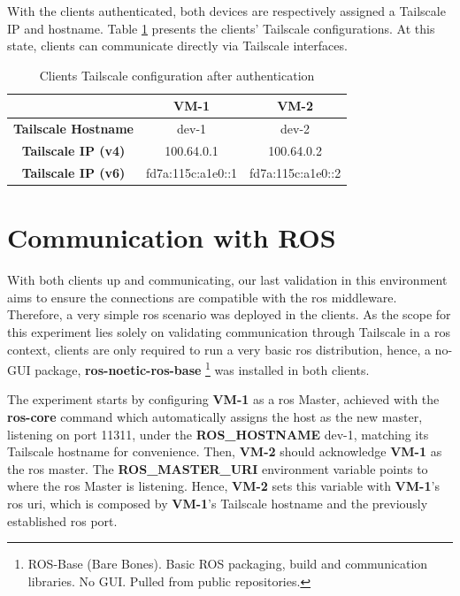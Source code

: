 \documentclass[11pt,twoside,a4paper]{report}
\begin{document}
With the clients authenticated, both devices are respectively assigned a Tailscale IP and hostname. Table \ref{tab:tsips} presents the clients' Tailscale configurations. At this state, clients can communicate directly via Tailscale interfaces.

\begin{table}[]
\centering
\begin{tabular}{c|c|c|}
\cline{2-3}
\textbf{}                                         & \textbf{VM-1} & \textbf{VM-2} \\ \hline
\multicolumn{1}{|c|}{\textbf{Tailscale Hostname}} & dev-1         & dev-2         \\ \hline
\multicolumn{1}{|c|}{\textbf{Tailscale IP (v4)}}  & 100.64.0.1    & 100.64.0.2    \\ \hline
\multicolumn{1}{|c|}{\textbf{Tailscale IP (v6)}}  & fd7a:115c:a1e0::1     & fd7a:115c:a1e0::2         \\ \hline
\end{tabular}
\caption{Clients Tailscale configuration after authentication}
\label{tab:tsips}
\end{table}

\section{Communication with ROS}

With both clients up and communicating, our last validation in this environment aims to ensure the connections are compatible with the \ac{ros} middleware. Therefore, a very simple \ac{ros} scenario was deployed in the clients. As the scope for this experiment lies solely on validating communication through Tailscale in a \ac{ros} context, clients are only required to run a very basic \ac{ros} distribution, hence, a no-GUI package, \textbf{ros-noetic-ros-base} \footnote{ROS-Base (Bare Bones). Basic ROS packaging, build and communication libraries. No GUI. Pulled from public repositories.} was installed in both clients.

The experiment starts by configuring \textbf{VM-1} as a \ac{ros} Master, achieved with the \textbf{ros-core} command which automatically assigns the host as the new master, listening on port 11311, under the \textbf{ROS\_HOSTNAME} dev-1, matching its Tailscale hostname for convenience. Then, \textbf{VM-2} should acknowledge \textbf{VM-1} as the \ac{ros} master. The \textbf{ROS\_MASTER\_URI} environment variable points to where the \ac{ros} Master is listening. Hence, \textbf{VM-2} sets this variable with \textbf{VM-1}'s \ac{ros} \ac{uri}, which is composed by \textbf{VM-1}'s Tailscale hostname and the previously established \ac{ros} port.
\end{document}
